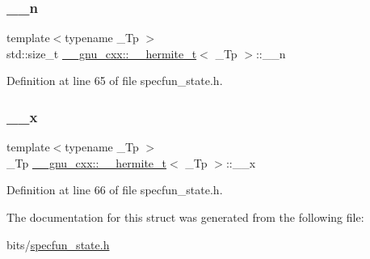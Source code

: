 \subsubsection{\texorpdfstring{\+\_\+\+\_\+n}{\_\_n}}
{\footnotesize\ttfamily template$<$typename \+\_\+\+Tp $>$ \\
std\+::size\+\_\+t \hyperlink{struct____gnu__cxx_1_1____hermite__t}{\+\_\+\+\_\+gnu\+\_\+cxx\+::\+\_\+\+\_\+hermite\+\_\+t}$<$ \+\_\+\+Tp $>$\+::\+\_\+\+\_\+n}



Definition at line 65 of file specfun\+\_\+state.\+h.

\mbox{\label{struct____gnu__cxx_1_1____hermite__t_a0d0d266ed927f890a51f9a5ef635a5d3}} 
\subsubsection{\texorpdfstring{\+\_\+\+\_\+x}{\_\_x}}
{\footnotesize\ttfamily template$<$typename \+\_\+\+Tp $>$ \\
\+\_\+\+Tp \hyperlink{struct____gnu__cxx_1_1____hermite__t}{\+\_\+\+\_\+gnu\+\_\+cxx\+::\+\_\+\+\_\+hermite\+\_\+t}$<$ \+\_\+\+Tp $>$\+::\+\_\+\+\_\+x}



Definition at line 66 of file specfun\+\_\+state.\+h.



The documentation for this struct was generated from the following file\+:\begin{DoxyCompactItemize}
\item 
bits/\hyperlink{specfun__state_8h}{specfun\+\_\+state.\+h}\end{DoxyCompactItemize}
